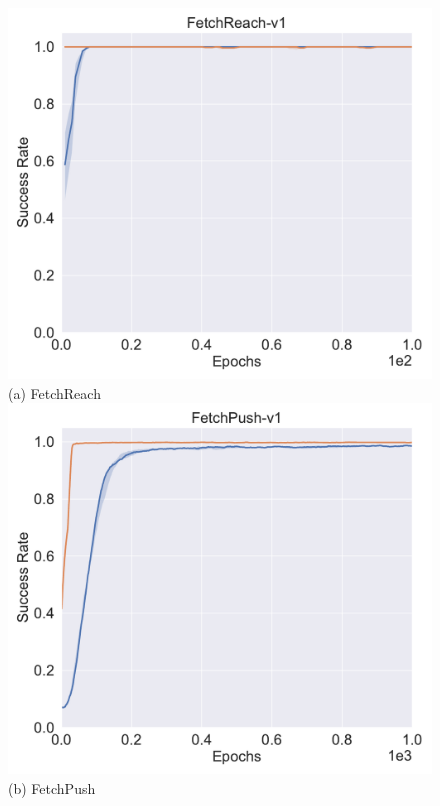 \begin{figure}[H]
  \centering
  \includegraphics[width=\linewidth]{figures/chapter3/reach_her.pdf}
  ({a}) FetchReach
\endminipage
{}%
  \centering
  \includegraphics[width=\linewidth]{figures/chapter3/push_her.pdf}
  ({b}) FetchPush
\endminipage\hfill
{}%
  \centering

\end{figure}
